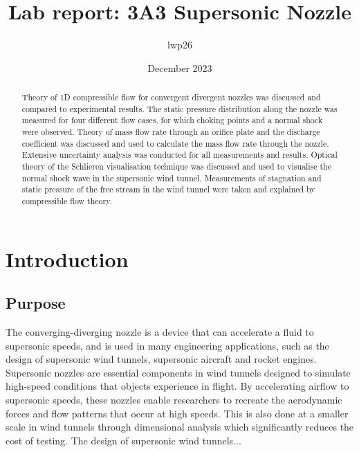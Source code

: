 \documentclass{article}
\begin{document}

\title{Lab report: 3A3 Supersonic Nozzle}
\author{lwp26}
\date{December 2023}
\maketitle

\begin{abstract}
    \centering
    Theory of 1D compressible flow for convergent divergent nozzles was discussed and compared to experimental results.
    The static pressure distribution along the nozzle was measured for four different flow cases, for which choking points and a normal shock were observed.
    Theory of mass flow rate through an orifice plate and the discharge coefficient was discussed and used to calculate the mass flow rate through the nozzle.
    Extensive uncertainty analysis was conducted for all measurements and results.
    Optical theory of the Schlieren visualisation technique was discussed and used to visualise the normal shock wave in the supersonic wind tunnel.
    Measurements of stagnation and static pressure of the free stream in the wind tunnel were taken and explained by compressible flow theory.
\end{abstract}

\newpage

\section{Introduction}

\subsection{Purpose}
The converging-diverging nozzle is a device that can accelerate a fluid to supersonic speeds, and is used in many engineering applications, such as the design of supersonic wind tunnels, supersonic aircraft and rocket engines.
Supersonic nozzles are essential components in wind tunnels designed to simulate high-speed conditions that objects experience in flight.
By accelerating airflow to supersonic speeds, these nozzles enable researchers to recreate the aerodynamic forces and flow patterns that occur at high speeds.
This is also done at a smaller scale in wind tunnels through dimensional analysis which significantly reduces the cost of testing.
The design of supersonic wind tunnels...
\end{document}

